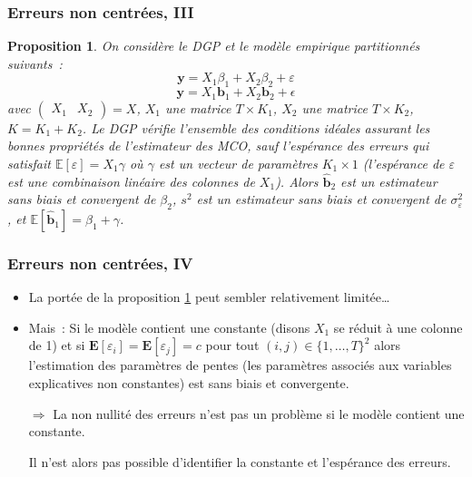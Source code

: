 \documentclass[10pt]{beamer}
\newcommand{\epsvar}{\sigma_{\varepsilon}^2}
\theoremstyle{plain}
\newtheorem{prop}{Proposition}
\begin{document}
\begin{frame}
  \frametitle{Erreurs non centrées, III}

  \begin{prop}\label{prop:nonzero-mean-error-nobiais}
    On considère le DGP et le modèle empirique partitionnés suivants~:
    \[
      \mathbf y = X_1\beta_1 + X_2\beta_2 + \varepsilon
    \]
    \[
      \mathbf y = X_1\mathbf b_1 + X_2\mathbf b_2 + \epsilon
    \]
    avec $\begin{pmatrix}X_1 & X_2\end{pmatrix}=X$, $X_1$ une
    matrice $T\times K_1$, $X_2$ une
    matrice $T\times K_2$, $K = K_1+K_2$. Le DGP vérifie l'ensemble
    des conditions idéales assurant les bonnes propriétés de
    l'estimateur des MCO, sauf l'espérance des erreurs qui satisfait $\mathbb E \left[ \varepsilon \right] = X_1\gamma $
    où $\gamma$ est un vecteur de paramètres $K_1\times 1$
    (l'espérance de $\varepsilon$ est une combinaison linéaire des
    colonnes de $X_1$). Alors $\hat{\mathbf b}_2$ est un estimateur
    sans biais et convergent de $\beta_2$, $s^2$ est un estimateur
    sans biais et convergent de $\epsvar$,
    et $\mathbb E\left[ \hat{\mathbf b}_1 \right] = \beta_1+\gamma$.
  \end{prop}

\end{frame}


\begin{frame}
  \frametitle{Erreurs non centrées, IV}

  \begin{itemize}

  \item La portée de la proposition \ref{prop:nonzero-mean-error-nobiais} peut sembler relativement limitée\dots\newline

  \item Mais~: Si le modèle contient une constante (disons $X_1$ se réduit à une colonne de 1) et si $\mathbf E[\varepsilon_i] = \mathbf E[\varepsilon_j] = c$ pour tout $(i,j)\in\{1,\dots,T\}^2$ alors l'estimation des paramètres de pentes (les paramètres associés aux variables explicatives non constantes) est sans biais et convergente.\newline

  \item[$\Rightarrow$] La non nullité des erreurs n'est pas un problème si le modèle contient une constante.\newline

  \item[\dbend] Il n'est alors pas possible d'identifier la constante et l'espérance des erreurs.

  \end{itemize}

\end{frame}
\end{document}
